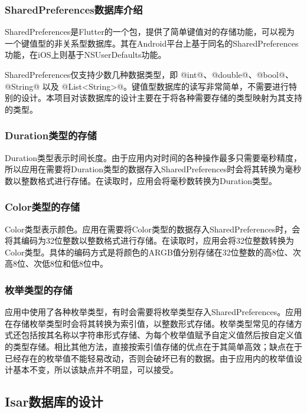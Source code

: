 \subsubsection{SharedPreferences数据库介绍}\label{subsubsec:shared-preferences-intro}

SharedPreferences是Flutter的一个包，提供了简单键值对的存储功能，可以视为一个键值型的非关系型数据库。其在Android平台上基于同名的SharedPreferences功能，在iOS上则基于NSUserDefaults功能。

SharedPreferences仅支持少数几种数据类型，即 @int@、@double@、@bool@、@String@ 以及 @List<String>@。键值型数据库的读写非常简单，不需要进行特别的设计。本项目对该数据库的设计主要在于将各种需要存储的类型映射为其支持的类型。

\subsubsection{Duration类型的存储}\label{subsubsec:duration-storage}

Duration类型表示时间长度。由于应用内对时间的各种操作最多只需要毫秒精度，所以应用在需要将Duration类型的数据存入SharedPreferences时会将其转换为毫秒数以整数格式进行存储。在读取时，应用会将毫秒数转换为Duration类型。

\subsubsection{Color类型的存储}\label{subsubsec:color-storage}

Color类型表示颜色。应用在需要将Color类型的数据存入SharedPreferences时，会将其编码为32位整数以整数格式进行存储。在读取时，应用会将32位整数转换为Color类型。具体的编码方式是将颜色的ARGB值分别存储在32位整数的高8位、次高8位、次低8位和低8位中。

\subsubsection{枚举类型的存储}\label{subsubsec:enum-storage}

应用中使用了各种枚举类型，有时会需要将枚举类型存入SharedPreferences。应用在存储枚举类型时会将其转换为索引值，以整数形式存储。枚举类型常见的存储方式还包括按其名称以字符串形式存储、为每个枚举值赋予自定义值然后按自定义值的类型存储。相比其他方法，直接按索引值存储的优点在于其简单高效；缺点在于已经存在的枚举值不能轻易改动，否则会破坏已有的数据。由于应用内的枚举值设计基本不变，所以该缺点并不明显，可以接受。

\subsection{Isar数据库的设计}\label{subsec:isar}


